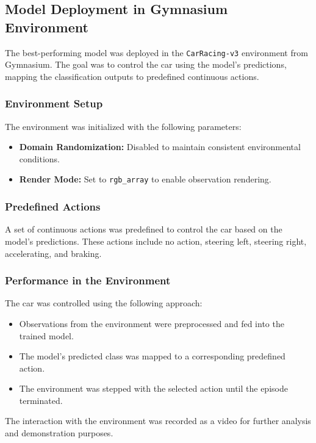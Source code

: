 \documentclass{article}
\begin{document}
\subsection{Model Deployment in Gymnasium Environment}

The best-performing model was deployed in the \texttt{CarRacing-v3} environment from Gymnasium. The goal was to control the car using the model's predictions, mapping the classification outputs to predefined continuous actions.

\subsubsection{Environment Setup}

The environment was initialized with the following parameters:
\begin{itemize}
    \item \textbf{Domain Randomization:} Disabled to maintain consistent environmental conditions.
    \item \textbf{Render Mode:} Set to \texttt{rgb\_array} to enable observation rendering.
\end{itemize}

\subsubsection{Predefined Actions}
A set of continuous actions was predefined to control the car based on the model's predictions. These actions include no action, steering left, steering right, accelerating, and braking.

\subsubsection{Performance in the Environment}

The car was controlled using the following approach:
\begin{itemize}
    \item Observations from the environment were preprocessed and fed into the trained model.
    \item The model's predicted class was mapped to a corresponding predefined action.
    \item The environment was stepped with the selected action until the episode terminated.
\end{itemize}

\noindent
The interaction with the environment was recorded as a video for further analysis and demonstration purposes.
\end{document}
